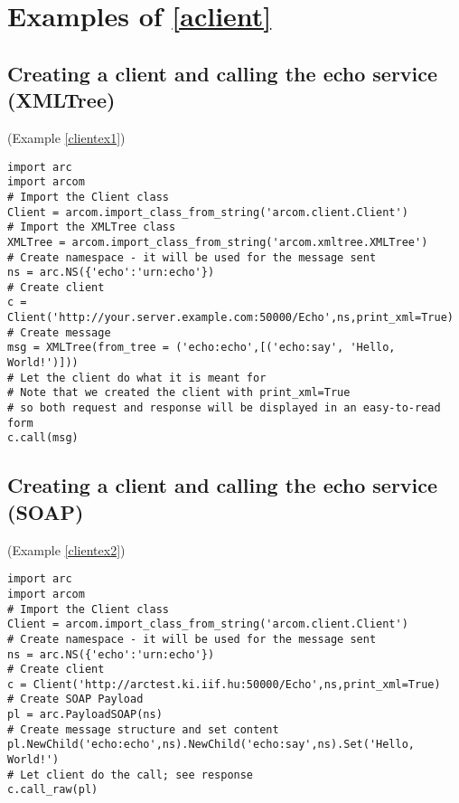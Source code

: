 \section{Examples of \ref{aclient}}
\subsection{Creating a client and calling the echo service (XMLTree)}
(Example \ref{clientex1})
\label{cclientex1}
\begin{verbatim}
import arc
import arcom
# Import the Client class
Client = arcom.import_class_from_string('arcom.client.Client')
# Import the XMLTree class
XMLTree = arcom.import_class_from_string('arcom.xmltree.XMLTree')
# Create namespace - it will be used for the message sent
ns = arc.NS({'echo':'urn:echo'})
# Create client
c = Client('http://your.server.example.com:50000/Echo',ns,print_xml=True)
# Create message
msg = XMLTree(from_tree = ('echo:echo',[('echo:say', 'Hello, World!')]))
# Let the client do what it is meant for
# Note that we created the client with print_xml=True
# so both request and response will be displayed in an easy-to-read form
c.call(msg)
\end{verbatim}

\subsection{Creating a client and calling the echo service (SOAP)}
(Example \ref{clientex2})
\label{cclientex2}
\begin{verbatim}
import arc
import arcom
# Import the Client class
Client = arcom.import_class_from_string('arcom.client.Client')
# Create namespace - it will be used for the message sent
ns = arc.NS({'echo':'urn:echo'})
# Create client
c = Client('http://arctest.ki.iif.hu:50000/Echo',ns,print_xml=True)
# Create SOAP Payload
pl = arc.PayloadSOAP(ns)
# Create message structure and set content
pl.NewChild('echo:echo',ns).NewChild('echo:say',ns).Set('Hello, World!')
# Let client do the call; see response
c.call_raw(pl)
\end{verbatim}

